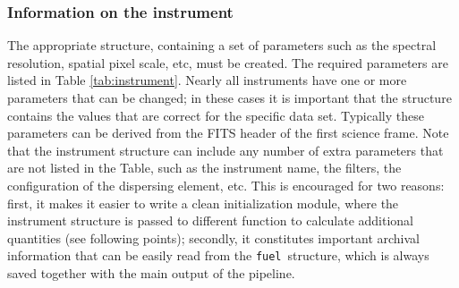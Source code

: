 \documentclass[a4paper]{article}
\newcommand{\fuel}{\texttt{fuel}}
\begin{document}
\begin{sloppypar}
\subsubsection{Information on the instrument}

The appropriate  structure, containing a set of parameters such as the spectral resolution, spatial pixel scale, etc, must be created. The required parameters are listed in Table \ref{tab:instrument}. Nearly all instruments have one or more parameters that can be changed; in these cases it is important that the  structure contains the values that are correct for the specific data set. Typically these parameters can be derived from the FITS header of the first science frame. Note that the instrument structure can include any number of extra parameters that are not listed in the Table, such as the instrument name, the filters, the configuration of the dispersing element, etc. This is encouraged for two reasons: first, it makes it easier to write a clean initialization module, where the instrument structure is passed to different function to calculate additional quantities (see following points); secondly, it constitutes important archival information that can be easily read from the \fuel\ structure, which is always saved together with the main output of the pipeline.


 \begin{table}
 \caption{Required fields of the  structure \label{tab:instrument}}
 \medskip
 \footnotesize
 \end{table}




\end{sloppypar}
\end{document}
